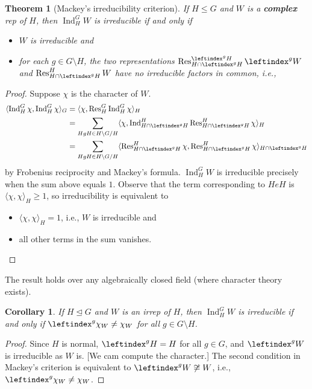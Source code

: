 \documentclass{article}
\theoremstyle{definition}
\theoremstyle{remark}
\theoremstyle{plain}
\newtheorem{thm}[defn]{Theorem}
\newtheorem{crly}[defn]{Corollary}
\newcommand{\Ind}{\operatorname{Ind}}
\newcommand{\Res}{\operatorname{Res}}
\begin{document}
\begin{thm}[Mackey's irreducibility criterion]
    If $H\le G$ and $W$ is a \textbf{complex} rep of $H$, then $\Ind_H^GW$ is irreducible if and only if
    \begin{itemize}
        \item $W$ is irreducible and
        \item for each $g\in G\setminus H$, the two representations $\Res^{\leftindex^gH}_{H\cap\leftindex^gH}\leftindex^gW$ and $\Res^H_{H\cap\leftindex^gH}W$ have no irreducible factors in common, i.e., 
    \end{itemize}
\end{thm}
\begin{proof}
    Suppose $\chi$ is the character of $W$.
    \begin{align*}
        \langle\Ind_H^G\chi,\Ind_H^G\chi\rangle_G&=\langle\chi,\Res^G_H\Ind_H^G\chi\rangle_H\\
        &=\sum_{HgH\in H\backslash G/H}\langle\chi,\Ind_{H\cap\leftindex^gH}^H\Res^H_{H\cap\leftindex^gH}\chi\rangle_H\\
        &=\sum_{HgH\in H\backslash G/H}\langle\Res^H_{H\cap\leftindex^gH}\chi,\Res^H_{H\cap\leftindex^gH}\chi\rangle_{H\cap\leftindex^gH}
    \end{align*}
    by Frobenius reciprocity and Mackey's formula. $\Ind_H^GW$ is irreducible precisely when the sum above equals $1$. Observe that the term corresponding to $HeH$ is $\langle\chi,\chi\rangle_{H}\ge 1$, so irreducibility is equivalent to 
    \begin{itemize}
        \item $\langle\chi,\chi\rangle_H=1$, i.e., $W$ is irreducible and
        \item all other terms in the sum vanishes.
    \end{itemize}
\end{proof}
The result holds over any algebraically closed field (where character theory exists).
\begin{crly}
    If $H\trianglelefteq G$ and $W$ is an irrep of $H$, then $\Ind_H^GW$ is irreducible if and only if $\leftindex^g\chi_W\neq\chi_W$ for all $g\in G\setminus H$.
\end{crly}
\begin{proof}
    Since $H$ is normal, $\leftindex^gH=H$ for all $g\in G$, and $\leftindex^g W$ is irreducible as $W$ is. [We cam compute the character.] The second condition in Mackey's criterion is equivalent to $\leftindex^gW\not\cong W$, i.e., $\leftindex^g\chi_W\neq\chi_W$.
\end{proof}
\end{document}
